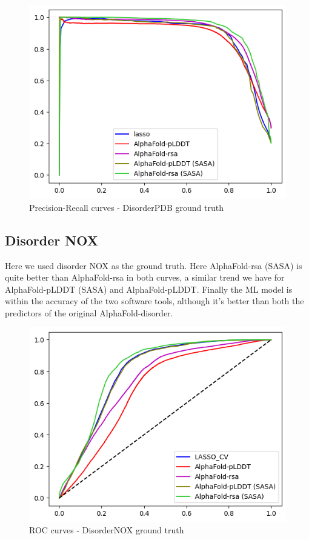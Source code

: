 \begin{figure}[h!]
    \centering
    \includegraphics[scale = 0.73]{res/ML/precisionrecall-disorderpdb.png}
    \caption{Precision-Recall curves - DisorderPDB ground truth}
\end{figure}

\pagebreak

\subsection{Disorder NOX}

Here we used disorder NOX as the ground truth. Here AlphaFold-rsa (SASA) is quite better than AlphaFold-rsa in both curves, a similar trend we have for AlphaFold-pLDDT (SASA) and AlphaFold-pLDDT. Finally the ML model is within the accuracy of the two software tools, although it's better than both the predictors of the original AlphaFold-disorder.

\begin{figure}[h!]
    \centering
    \includegraphics[scale = 0.73]{res/ML/roc-disordernox.png}
    \caption{ROC curves - DisorderNOX ground truth}
\end{figure}



